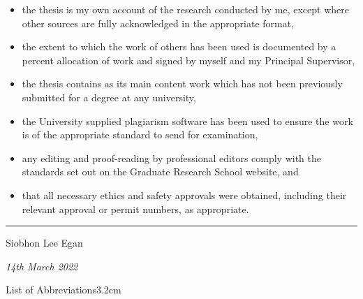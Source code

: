\documentclass[a4paper, nobind]{templates/ociamthesis}
\providecommand{\tightlist}{%
  \setlength{\itemsep}{0pt}\setlength{\parskip}{0pt}}
\begin{document}
\begin{romanpages}
\begin{declaration}
  \begin{itemize}
  \tightlist
  \item
    the thesis is my own account of the research conducted by me, except where other sources are fully acknowledged in the appropriate format,
  \item
    the extent to which the work of others has been used is documented by a percent allocation of work and signed by myself and my Principal Supervisor,
  \item
    the thesis contains as its main content work which has not been previously submitted for a degree at any university,
  \item
    the University supplied plagiarism software has been used to ensure the work is of the appropriate standard to send for examination,
  \item
    any editing and proof-reading by professional editors comply with the standards set out on the Graduate Research School website, and
  \item
    that all necessary ethics and safety approvals were obtained, including their relevant approval or permit numbers, as appropriate.
  \end{itemize}

  \vspace{3mm}

  \raggedright

  \begin{center}\rule{0.5\linewidth}{0.5pt}\end{center}

  Siobhon Lee Egan

  \emph{14th March 2022}
\end{declaration}


  \dominitoc %

\flushbottom

\tableofcontents

\listoffigures
	\mtcaddchapter

\listoftables
  \mtcaddchapter
\begin{mclistof}{List of Abbreviations}{3.2cm}


\end{mclistof}
\end{romanpages}
\end{document}
